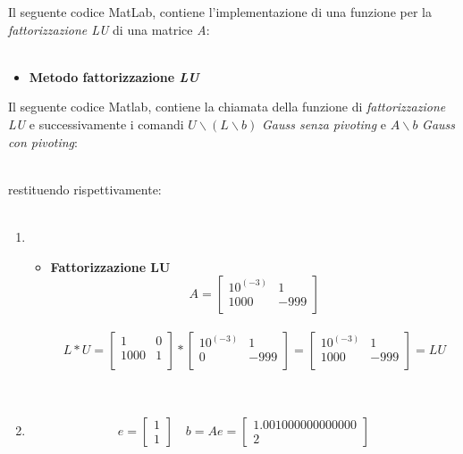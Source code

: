 Il seguente codice MatLab, contiene l'implementazione di una funzione per la \textit{fattorizzazione LU} di una matrice \textit{A}:\\\
\begin{itemize}
\item \textbf{Metodo fattorizzazione \textit{LU}}	

\end{itemize}
Il seguente codice Matlab, contiene la chiamata della funzione di \textit{fattorizzazione LU} e successivamente i comandi $U \backslash (L \backslash b)$ \textit{Gauss senza pivoting} e $A \backslash b$ \textit{Gauss con pivoting}:\\\

restituendo rispettivamente:\\\
\begin{enumerate}
\item 
\begin{itemize}
\item \textbf{Fattorizzazione LU}
\[
A =\begin{bmatrix}
	10^{(-3)} &   1  \\
	 1000   & -999 \\
\end{bmatrix}
\]\\
\[
L*U =\begin{bmatrix}
	1    & 0 \\
	1000 & 1 \\
\end{bmatrix} *
\begin{bmatrix}
	10^{(-3)} & 1    \\
	0       & -999 \\
\end{bmatrix} 
= \begin{bmatrix}
	10^{(-3)} &   1  \\
	 1000   & -999 \\
\end{bmatrix} = LU
\]\\\
\end{itemize}
\item
\[
e = \begin{bmatrix}
	1 \\
	1
\end{bmatrix} \quad 
b = Ae =\begin{bmatrix}
	1.001000000000000 \\
	2                 
\end{bmatrix}
\]\\\

\end{enumerate}
